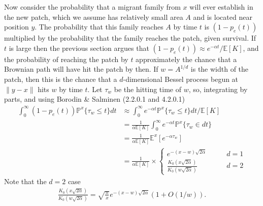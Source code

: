 \documentclass{article}
\renewcommand{\P}{\mathbb{P}}
\newcommand{\E}{\mathbb{E}}
\begin{document}
Now consider the probability that a migrant family from $x$ will ever establish in the new patch,
which we assume has relatively small area $A$ and is located near position $y$.
The probability that this family reaches $A$ by time $t$ is $(1-p_e(t))$
multiplied by the probability that the family reaches the patch, given survival.
If $t$ is large then the previous section argues that $(1-p_e(t)) \approx e^{-\alpha t}/\E[K]$,
and the probability of reaching the patch by $t$ approximately the chance that a Brownian path
will have hit the patch by then.
If $w = A^{1/d}$ is the width of the patch, then 
this is the chance that a $d$-dimensional Bessel process begun at $\|y-x\|$ hits $w$ by time $t$.
Let $\tau_w$ be the hitting time of $w$,
so, integrating by parts, and using Borodin \& Salminen (2.2.0.1 and 4.2.0.1)
\begin{align}
    \int_0^\infty (1-p_e(t)) \P^x\{ \tau_w \le t \} dt  
    &\approx \int_0^\infty e^{-\alpha t} \P^x\{ \tau_w \le t \} dt  / \E[K] \\
    &= \frac{1}{\alpha \E[K]} \int_0^\infty e^{-\alpha t} \P^x\{ \tau_w \in dt \} \\
    &= \frac{1}{\alpha \E[K]} \E^x[e^{-\alpha \tau_w}] \\
    &= 
    \frac{1}{\alpha \E[K]} \times
    \begin{cases}
        e^{-(x-w) \sqrt{2\alpha}} \qquad & d=1 \\
        \frac{ K_0(x\sqrt{2\alpha}) }{ K_0(w\sqrt{2\alpha}) } \qquad & d=2 
    \end{cases}
\end{align}
Note that the $d=2$ case
\begin{align}
    \frac{ K_0(x\sqrt{2\alpha}) }{ K_0(w\sqrt{2\alpha}) } = \sqrt{\frac{w}{x}} e^{-(x-w)\sqrt{2\alpha}} ( 1 + O(1/w) ).
\end{align}
\end{document}
